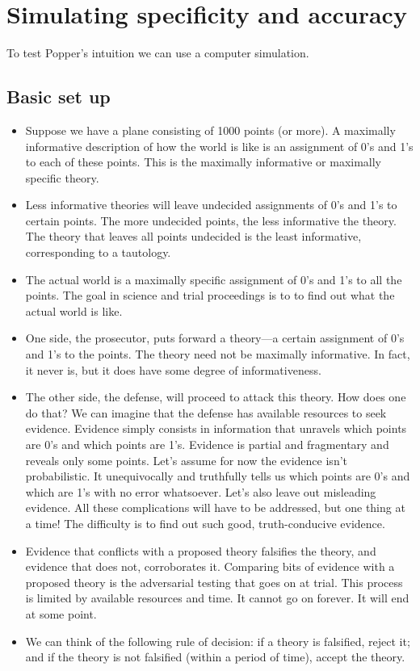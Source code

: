 \documentclass[
  11pt,
  dvipsnames,enabledeprecatedfontcommands]{scrartcl}
\begin{document}
\hypertarget{simulating-specificity-and-accuracy}{%
\section{Simulating specificity and
accuracy}\label{simulating-specificity-and-accuracy}}

To test Popper's intuition we can use a computer simulation.

\hypertarget{basic-set-up}{%
\subsection{Basic set up}\label{basic-set-up}}

\begin{itemize}
\item
  Suppose we have a plane consisting of 1000 points (or more). A
  maximally informative description of how the world is like is an
  assignment of 0's and 1's to each of these points. This is the
  maximally informative or maximally specific theory.
\item
  Less informative theories will leave undecided assignments of 0's and
  1's to certain points. The more undecided points, the less informative
  the theory. The theory that leaves all points undecided is the least
  informative, corresponding to a tautology.
\item
  The actual world is a maximally specific assignment of 0's and 1's to
  all the points. The goal in science and trial proceedings is to to
  find out what the actual world is like.
\item
  One side, the prosecutor, puts forward a theory---a certain assignment
  of 0's and 1's to the points. The theory need not be maximally
  informative. In fact, it never is, but it does have some degree of
  informativeness.
\item
  The other side, the defense, will proceed to attack this theory. How
  does one do that? We can imagine that the defense has available
  resources to seek evidence. Evidence simply consists in information
  that unravels which points are 0's and which points are 1's. Evidence
  is partial and fragmentary and reveals only some points. Let's assume
  for now the evidence isn't probabilistic. It unequivocally and
  truthfully tells us which points are 0's and which are 1's with no
  error whatsoever. Let's also leave out misleading evidence. All these
  complications will have to be addressed, but one thing at a time! The
  difficulty is to find out such good, truth-conducive evidence.
\item
  Evidence that conflicts with a proposed theory falsifies the theory,
  and evidence that does not, corroborates it. Comparing bits of
  evidence with a proposed theory is the adversarial testing that goes
  on at trial. This process is limited by available resources and time.
  It cannot go on forever. It will end at some point.
\item
  We can think of the following rule of decision: if a theory is
  falsified, reject it; and if the theory is not falsified (within a
  period of time), accept the theory.
\end{itemize}
\end{document}
